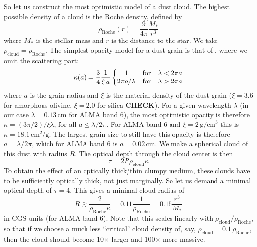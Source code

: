 \documentclass{aa}
\begin{document}
So let us construct the most optimistic model of a dust cloud. The highest
possible density of a cloud is the Roche density, defined by
\begin{equation}
\rho_{\mathrm{Roche}}(r) = \frac{9}{4\pi}\frac{M_{*}}{r^3}
\end{equation}
where $M_{*}$ is the stellar mass and $r$ is the distance to the star. We take
$\rho_{\mathrm{cloud}}=\rho_{\mathrm{Roche}}$. The simplest opacity model for a
dust grain is that of \cite{1997MNRAS.291..121I}, where we omit the scattering
part:
\begin{equation}
\kappa(a) = \frac{3}{4}\frac{1}{\xi\,a}\left\{\begin{matrix}
1 & \hbox{for} & \lambda<2\pi a \\
2\pi a/\lambda & \hbox{for} & \lambda>2\pi a \\
\end{matrix}\right.
\end{equation}
where $a$ is the grain radius and $\xi$ is the material density of the dust
grain ($\xi=3.6$ for amorphous olivine, $\xi=2.0$ for silica {\bf CHECK}). For a
given wavelength $\lambda$ (in our case $\lambda=0.13\,\mathrm{cm}$ for ALMA
band 6), the most optimistic opacity is therefore $\kappa=(3\pi/2)/\xi\lambda$,
for all $a\le \lambda/2\pi$. For ALMA band 6 and $\xi=2\,\mathrm{g/cm}^3$ this
is $\kappa=18.1\,\mathrm{cm}^2/\mathrm{g}$. The largest grain size to still
have this opacity is therefore $a=\lambda/2\pi$, which for ALMA band 6 is
$a=0.02\,\mathrm{cm}$.  We make a spherical cloud of this dust with radius
$R$. The optical depth through the cloud center is then
\begin{equation}
\tau = 2R\rho_{\mathrm{cloud}}\kappa
\end{equation}
To obtain the effect of an optically thick/thin clumpy medium, these clouds
have to be sufficiently optically thick, not just marginally. So let us demand
a minimal optical depth of $\tau=4$. This gives a minimal cloud radius of
\begin{equation}
  R\gtrsim \frac{2}{\rho_{\mathrm{Roche}}\kappa} = 0.11\frac{1}{\rho_{\mathrm{Roche}}}
  = 0.15\frac{r^3}{M_{*}}
\end{equation}
in CGS units (for ALMA band 6). Note that this scales linearly with
$\rho_{\mathrm{cloud}}/\rho_{\mathrm{Roche}}$, so that if we choose a much less
``critical'' cloud density of, say, $\rho_{\mathrm{cloud}}=0.1\,\rho_{\mathrm{Roche}}$,
then the cloud should become 10$\times$ larger and 100$\times$ more massive.
\end{document}
